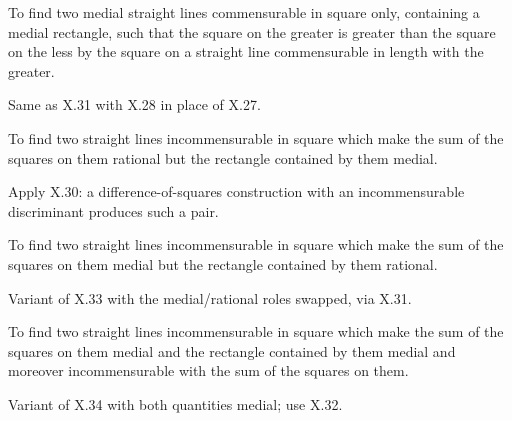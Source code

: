 \documentclass{rrxiv}
\begin{document}
\begin{claim}
\label{prop:X.32}
To find two medial straight lines commensurable in square only,
containing a medial rectangle, such that the square on the greater
is greater than the square on the less by the square on a straight
line commensurable in length with the greater.
\end{claim}
\begin{evidence}[Proof of X.32]
\label{ev:X.32}
Same as X.31 with X.28 in place of X.27.
\end{evidence}

\begin{claim}
\label{prop:X.33}
To find two straight lines incommensurable in square which make the
sum of the squares on them rational but the rectangle contained by
them medial.
\end{claim}
\begin{evidence}[Proof of X.33]
\label{ev:X.33}
Apply X.30: a difference-of-squares construction with an
incommensurable discriminant produces such a pair.
\end{evidence}

\begin{claim}
\label{prop:X.34}
To find two straight lines incommensurable in square which make the
sum of the squares on them medial but the rectangle contained by
them rational.
\end{claim}
\begin{evidence}[Proof of X.34]
\label{ev:X.34}
Variant of X.33 with the medial/rational roles swapped, via X.31.
\end{evidence}

\begin{claim}
\label{prop:X.35}
To find two straight lines incommensurable in square which make the
sum of the squares on them medial and the rectangle contained by
them medial and moreover incommensurable with the sum of the squares
on them.
\end{claim}
\begin{evidence}[Proof of X.35]
\label{ev:X.35}
Variant of X.34 with both quantities medial; use X.32.
\end{evidence}
\end{document}
